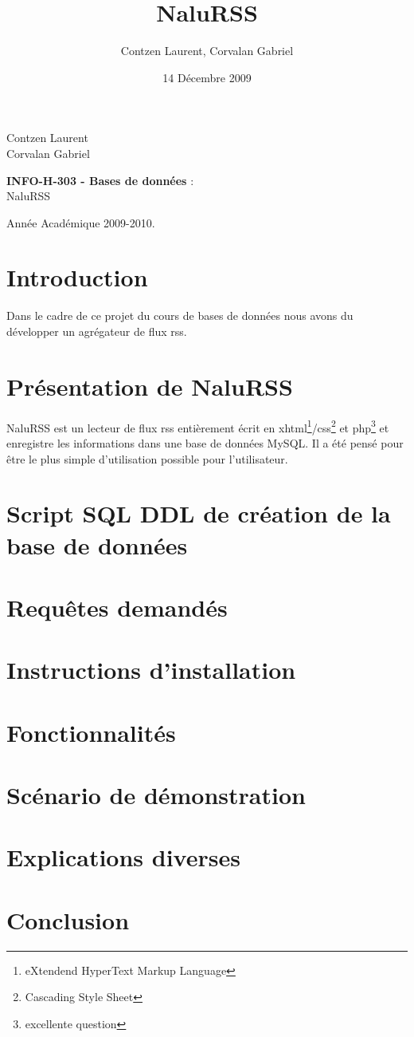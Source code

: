 \documentclass[11pt]{article}
\author{Contzen Laurent, Corvalan Gabriel}
\title{NaluRSS}
\date{14 Décembre 2009}
\begin{document}
\begin{titlepage}
\begin{flushleft}
Contzen Laurent \\
Corvalan Gabriel \\
\end{flushleft}
\begin{center}
\vspace{65mm}\LARGE{\textbf{INFO-H-303 - Bases de données} :\\
NaluRSS}
\end{center}
\begin{flushright}
\vspace{70mm}
Année Académique 2009-2010.
\end{flushright}
\end{titlepage}
\tableofcontents
\newpage

\section{Introduction}
Dans le cadre de ce projet du cours de bases de données nous avons du développer un agrégateur de flux rss.
\section{Présentation de NaluRSS}
NaluRSS est un lecteur de flux rss entièrement écrit en xhtml\footnote{eXtendend HyperText Markup Language}/css\footnote{Cascading Style Sheet} et php\footnote{excellente question} et enregistre les informations dans une base de données MySQL. Il a été pensé pour être le plus simple d'utilisation possible pour l'utilisateur.
\section{Script SQL DDL de création de la base de données}

\section{Requêtes demandés}

\section{Instructions d'installation}

\section{Fonctionnalités}

\section{Scénario de démonstration}

\section{Explications diverses}

\section{Conclusion}
\end{document}
